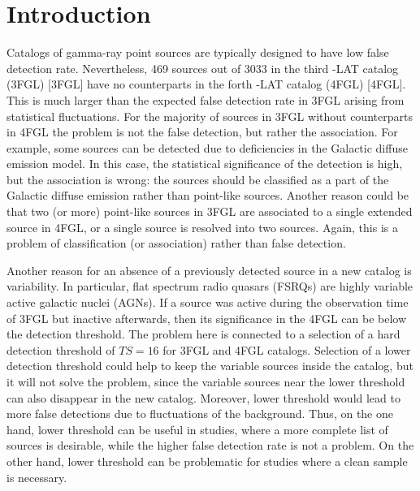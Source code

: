 \section{Introduction}

Catalogs of gamma-ray point sources are typically designed to have low false detection rate. 
Nevertheless, 469 sources out of 3033 in the third \Fermi-LAT catalog (3FGL) [3FGL] have no counterparts 
in the forth \Fermi-LAT catalog (4FGL) [4FGL].
This is much larger than the expected false detection rate in 3FGL arising from statistical fluctuations.
For the majority of sources in 3FGL without counterparts in 4FGL the problem is not the false detection, 
but rather the association.
For example, some sources can be detected due to deficiencies in the Galactic diffuse emission model.
In this case, the statistical significance of the detection is high, but the association is wrong: the sources should be classified as
a part of the Galactic diffuse emission rather than point-like sources.
Another reason could be that two (or more) point-like sources in 3FGL are associated to a single extended source in 4FGL,
or a single source is resolved into two sources.
Again, this is a problem of classification (or association) rather than false detection.

Another reason for an absence of a previously detected source in a new catalog is variability.
In particular, flat spectrum radio quasars (FSRQs) are highly variable active galactic nuclei (AGNs).
If a source was active during the observation time of 3FGL but inactive afterwards, 
then its significance in the 4FGL can be below the detection threshold.
The problem here is connected to a selection of a hard detection threshold of $TS = 16$ for 3FGL and 4FGL catalogs.
Selection of a lower detection threshold could help to keep the variable sources inside the catalog, 
but it will not solve the problem, since the variable sources near the lower threshold can also disappear in the new catalog.
Moreover, lower threshold would lead to more false detections due to fluctuations of the background.
Thus, on the one hand, lower threshold can be useful in studies, where a more complete list of sources is desirable,
while the higher false detection rate is not a problem. On the other hand, lower threshold can be problematic for studies where 
a clean sample is necessary. 

